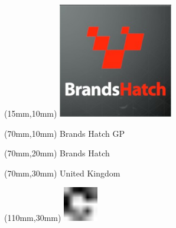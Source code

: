 \null\newpage
\begin{textblock*}{50mm}(15mm,10mm)%
\includegraphics[width=50mm]{LG/2015-05-20_00074.png}
\end{textblock*}
\begin{textblock*}{130mm}(70mm,10mm)%
{\fontsize{20}{20}\selectfont Brands Hatch GP}\\
\end{textblock*}
\begin{textblock*}{120mm}(70mm,20mm)%
{\fontsize{16}{16}\selectfont Brands Hatch}\\
\end{textblock*}
\begin{textblock*}{120mm}(70mm,30mm)%
{\fontsize{12}{12}\selectfont United Kingdom}
\end{textblock*}
\begin{textblock*}{30mm}(110mm,30mm)%
\centering
\includegraphics[height=15mm]{icons/fa-rotate-right.pdf}
\end{textblock*}
